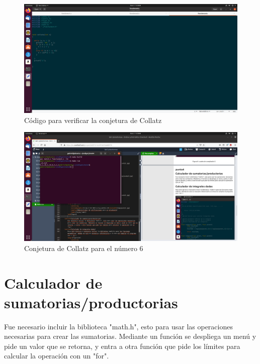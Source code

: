 \documentclass[
  letterpaper, 
  maincolor=black,
  sectioncolor=black!90,
  subsectioncolor=black!70,
  itemtextcolor=black!40,
]{fortysecondscv}
\begin{document}
        \begin{figure}[H]
            \centering
            \includegraphics[trim= 50 400 1100 100,clip,width=1.20\textwidth]{img/punto4.png}
            \caption{Código para verificar la conjetura de Collatz}
            \label{fig:my_label}
        \end{figure}
        \begin{figure}[H]
            \centering
            \includegraphics[trim= 130 550 980 100,clip,width=1.20\textwidth]{img/punto4-4.png}
            \caption{Conjetura de Collatz para el número 6}
            \label{fig:my_label}
        \end{figure}
        \newpage
    \section{Calculador de sumatorias/productorias}
        Fue necesario incluir la biblioteca "math.h", esto para usar las operaciones necesarias para crear las sumatorias. Mediante un función se despliega un menú y pide un valor que se retorna, y entra a otra función que pide los límites para calcular la operación con un "for".
        
\end{document}
